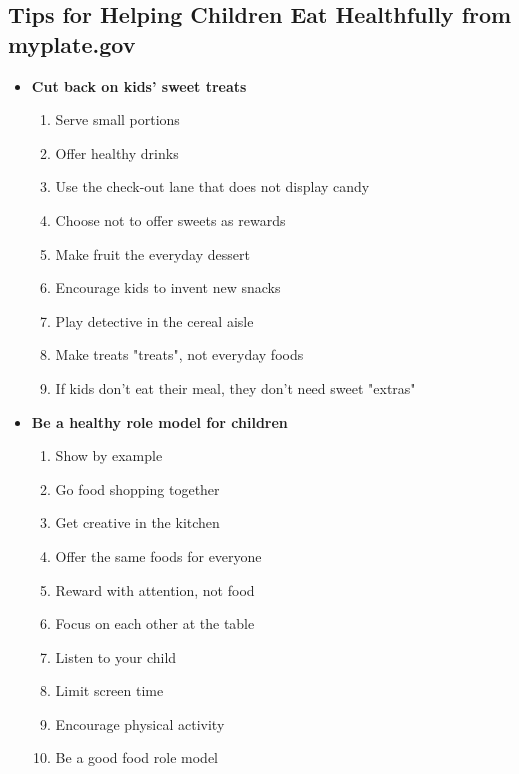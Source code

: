 \documentclass[12pt]{article}
\begin{document}
        \subsection{Tips for Helping Children Eat Healthfully from myplate.gov}
            \begin{itemize}
                \item \textbf{Cut back on kids' sweet treats}
                    \begin{enumerate}
                        \item Serve small portions
                        \item Offer healthy drinks
                        \item Use the check-out lane that does not display candy
                        \item Choose not to offer sweets as rewards
                        \item Make fruit the everyday dessert
                        \item Encourage kids to invent new snacks
                        \item Play detective in the cereal aisle
                        \item Make treats "treats", not everyday foods
                        \item If kids don't eat their meal, they don't need sweet "extras"
                    \end{enumerate}
                \item \textbf{Be a healthy role model for children}
                    \begin{enumerate}
                        \item Show by example
                        \item Go food shopping together
                        \item Get creative in the kitchen
                        \item Offer the same foods for everyone
                        \item Reward with attention, not food
                        \item Focus on each other at the table
                        \item Listen to your child
                        \item Limit screen time
                        \item Encourage physical activity
                        \item Be a good food role model
                    \end{enumerate}
            \end{itemize}
\end{document}

